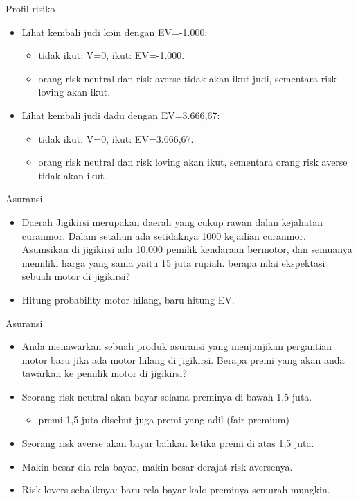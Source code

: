 \documentclass[
  ignorenonframetext,
]{beamer}
\providecommand{\tightlist}{%
  \setlength{\itemsep}{0pt}\setlength{\parskip}{0pt}}\usepackage{longtable,booktabs,array}
\begin{document}
\begin{frame}{Profil risiko}
\label{profil-risiko-1}
\begin{itemize}[<+->]
\item
  Lihat kembali judi koin dengan EV=-1.000:

  \begin{itemize}[<+->]
  \item
    tidak ikut: V=0, ikut: EV=-1.000.
  \item
    orang risk neutral dan risk averse tidak akan ikut judi, sementara
    risk loving akan ikut.
  \end{itemize}
\item
  Lihat kembali judi dadu dengan EV=3.666,67:

  \begin{itemize}[<+->]
  \item
    tidak ikut: V=0, ikut: EV=3.666,67.
  \item
    orang risk neutral dan risk loving akan ikut, sementara orang risk
    averse tidak akan ikut.
  \end{itemize}
\end{itemize}
\end{frame}

\begin{frame}{Asuransi}
\label{asuransi}
\begin{itemize}[<+->]
\item
  Daerah Jigikirsi merupakan daerah yang cukup rawan dalan kejahatan
  curanmor. Dalam setahun ada setidaknya 1000 kejadian curanmor.
  Asumsikan di jigikirsi ada 10.000 pemilik kendaraan bermotor, dan
  semuanya memiliki harga yang sama yaitu 15 juta rupiah. berapa nilai
  ekspektasi sebuah motor di jigikirsi?
\item
  Hitung probability motor hilang, baru hitung EV.
\end{itemize}
\end{frame}

\begin{frame}{Asuransi}
\label{asuransi-1}
\begin{itemize}[<+->]
\item
  Anda menawarkan sebuah produk asuransi yang menjanjikan pergantian
  motor baru jika ada motor hilang di jigikirsi. Berapa premi yang akan
  anda tawarkan ke pemilik motor di jigikirsi?
\item
  Seorang risk neutral akan bayar selama preminya di bawah 1,5 juta.

  \begin{itemize}[<+->]
  \tightlist
  \item
    premi 1,5 juta disebut juga premi yang adil (fair premium)
  \end{itemize}
\item
  Seorang risk averse akan bayar bahkan ketika premi di atas 1,5 juta.
\item
  Makin besar dia rela bayar, makin besar derajat risk aversenya.
\item
  Risk lovers sebaliknya: baru rela bayar kalo preminya semurah mungkin.
\end{itemize}
\end{frame}
\end{document}
